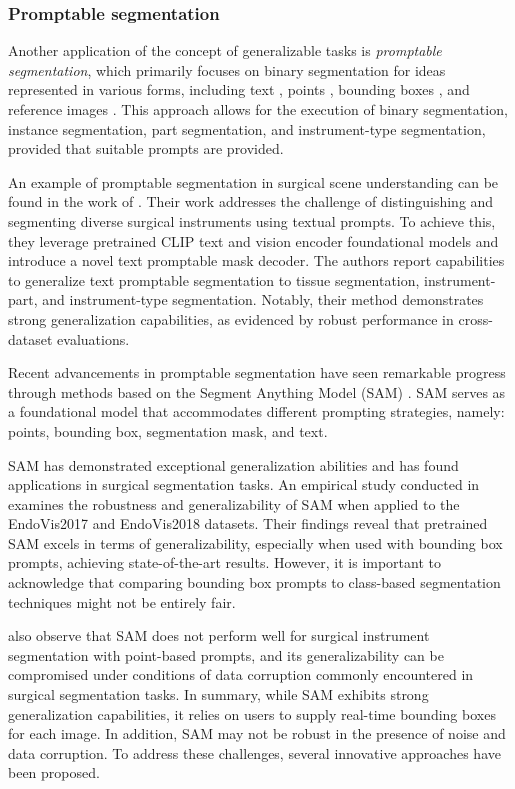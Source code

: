 \documentclass[times,twocolumn,final]{elsarticle}
\begin{document}
\subsubsection{Promptable segmentation}
Another application of the concept of generalizable tasks is \emph{promptable segmentation}, which primarily focuses on binary segmentation for ideas represented in various forms, including text \citep{zhou2023text}, points \citep{kirillov2023segment}, bounding boxes \citep{kirillov2023segment}, and reference images \citep{lueddecke22_cvpr}. This approach allows for the execution of binary segmentation, instance segmentation, part segmentation, and instrument-type segmentation, provided that suitable prompts are provided.


An example of promptable segmentation in surgical scene understanding can be found in the work of \citet{zhou2023text}. Their work addresses the challenge of distinguishing and segmenting diverse surgical instruments using textual prompts. To achieve this, they leverage pretrained CLIP text and vision encoder foundational models and introduce a novel text promptable mask decoder. The authors report capabilities to generalize text promptable segmentation to tissue segmentation, instrument-part, and instrument-type segmentation. Notably, their method demonstrates strong generalization capabilities,  as evidenced by robust performance in cross-dataset evaluations. 


Recent advancements in promptable segmentation have seen remarkable progress through methods based on the Segment Anything Model (SAM) \citep{kirillov2023segment}. SAM serves as a foundational model that accommodates different prompting strategies, namely: points, bounding box, segmentation mask, and text. 

SAM has demonstrated exceptional generalization abilities and has found applications in surgical segmentation tasks. An empirical study conducted in \citet{wang2023sam} examines the robustness and generalizability of SAM when applied to the EndoVis2017 and EndoVis2018 datasets. Their findings reveal that pretrained SAM excels in terms of generalizability, especially when used with bounding box prompts, achieving state-of-the-art results. However, it is important to acknowledge that comparing bounding box prompts to class-based segmentation techniques might not be entirely fair. 

\citet{wang2023sam} also observe that SAM does not perform well for surgical instrument segmentation with point-based prompts, and its generalizability can be compromised under conditions of data corruption commonly encountered in surgical segmentation tasks. In summary, while SAM exhibits strong generalization capabilities, it relies on users to supply real-time bounding boxes for each image. In addition, SAM may not be robust in the presence of noise and data corruption. To address these challenges, several innovative approaches have been proposed.
\end{document}
